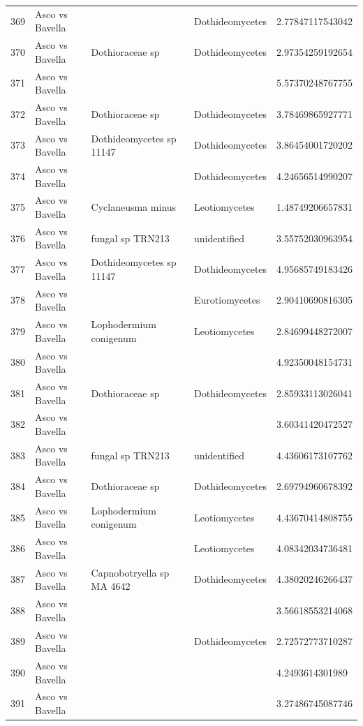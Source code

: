 \documentclass[12pt]{article}\usepackage[]{graphicx}\usepackage[]{color}
\numberwithin{figure}{section}
\begin{document}
\begin{table}[ht]
\begin{tabular}{lllll}
  369 & Asco vs Bavella &  & Dothideomycetes & 2.77847117543042 \\ 
  370 & Asco vs Bavella & Dothioraceae sp & Dothideomycetes & 2.97354259192654 \\ 
  371 & Asco vs Bavella &  &  & 5.57370248767755 \\ 
  372 & Asco vs Bavella & Dothioraceae sp & Dothideomycetes & 3.78469865927771 \\ 
  373 & Asco vs Bavella & Dothideomycetes sp 11147 & Dothideomycetes & 3.86454001720202 \\ 
  374 & Asco vs Bavella &  & Dothideomycetes & 4.24656514990207 \\ 
  375 & Asco vs Bavella & Cyclaneusma minus & Leotiomycetes & 1.48749206657831 \\ 
  376 & Asco vs Bavella & fungal sp TRN213 & unidentified & 3.55752030963954 \\ 
  377 & Asco vs Bavella & Dothideomycetes sp 11147 & Dothideomycetes & 4.95685749183426 \\ 
  378 & Asco vs Bavella &  & Eurotiomycetes & 2.90410690816305 \\ 
  379 & Asco vs Bavella & Lophodermium conigenum & Leotiomycetes & 2.84699448272007 \\ 
  380 & Asco vs Bavella &  &  & 4.92350048154731 \\ 
  381 & Asco vs Bavella & Dothioraceae sp & Dothideomycetes & 2.85933113026041 \\ 
  382 & Asco vs Bavella &  &  & 3.60341420472527 \\ 
  383 & Asco vs Bavella & fungal sp TRN213 & unidentified & 4.43606173107762 \\ 
  384 & Asco vs Bavella & Dothioraceae sp & Dothideomycetes & 2.69794960678392 \\ 
  385 & Asco vs Bavella & Lophodermium conigenum & Leotiomycetes & 4.43670414808755 \\ 
  386 & Asco vs Bavella &  & Leotiomycetes & 4.08342034736481 \\ 
  387 & Asco vs Bavella & Capnobotryella sp MA 4642 & Dothideomycetes & 4.38020246266437 \\ 
  388 & Asco vs Bavella &  &  & 3.56618553214068 \\ 
  389 & Asco vs Bavella &  & Dothideomycetes & 2.72572773710287 \\ 
  390 & Asco vs Bavella &  &  & 4.2493614301989 \\ 
  391 & Asco vs Bavella &  &  & 3.27486745087746 \\ 

\end{tabular}
\end{table}
\end{document}
